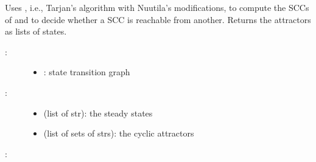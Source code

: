 \documentclass[letterpaper,10pt,english]{sphinxmanual}
\begin{document}
\begin{fulllineitems}
\label{\detokenize{Attractors:PyBoolNet.Attractors.compute_attractors_tarjan}}
Uses 
, i.e., Tarjan’s algorithm with Nuutila’s modifications, to compute the SCCs of  and
to decide whether a SCC is reachable from another.
Returns the attractors as lists of states.
\begin{description}
\item[{:}] \leavevmode\begin{itemize}
\item {} 
: state transition graph

\end{itemize}

\item[{:}] \leavevmode\begin{itemize}
\item {} 
 (list of str): the steady states

\item {} 
 (list of sets of strs): the cyclic attractors

\end{itemize}

\end{description}

:


\end{fulllineitems}
\end{document}
